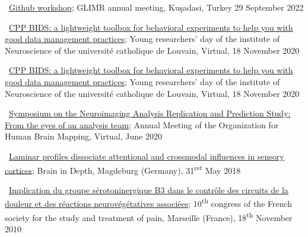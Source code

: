 \textbullet~\href{https://docs.google.com/presentation/d/1508GI_iLxyRwzJtWmnSQuSnfuGEUCaVXHguu8FRA4dI/}{Github workshop};
GLIMR annual meeting,
Kuşadasi, Turkey
29 September 2022

\textbullet~\href{https://osf.io/y7cjn/}{CPP BIDS: a lightweight toolbox for behavioral experiments to help you with good data management practices};
Young researchers' day of the institute of Neuroscience of the université catholique de Louvain,
Virtual,
18 November 2020

\textbullet~\href{https://osf.io/y7cjn/}{CPP BIDS: a lightweight toolbox for behavioral experiments to help you with good data management practices};
Young researchers' day of the institute of Neuroscience of the université catholique de Louvain,
Virtual,
18 November 2020

\textbullet~\href{https://osf.io/b8p9e/}{Symposium on the Neuroimaging Analysis
Replication and Prediction Study: From the eyes of an analysis team};
Annual Meeting of the Organization for Human Brain Mapping,
Virtual,
June 2020


\textbullet~\href{https://osf.io/b8p9e/}{Laminar profiles dissociate attentional and crossmodal influences in sensory cortices};
Brain in Depth,
Magdeburg (Germany),
31\textsuperscript{rst} May 2018

\textbullet~\href{https://osf.io/r7gfm/}{Implication du groupe sérotoninergique B3 dans le contrôle des circuits de la douleur et des réactions neurovégétatives associées};
10\textsuperscript{th} congress of the French society for the study and treatment of pain,
Marseille (France),
18\textsuperscript{th} November 2010
